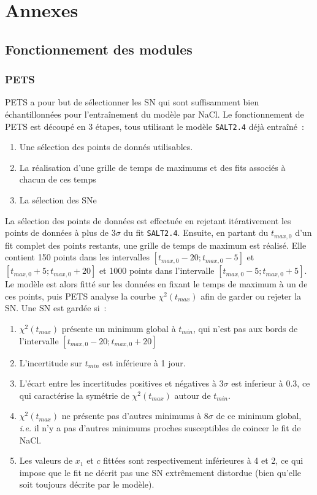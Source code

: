 \documentclass{book}
\newcommand{\todo}[1]{{\textcolor{gray}{\bf \large #1}}}
\begin{document}
\todo{}

\appendix
\chapter{Annexes}

\section{Fonctionnement des modules}

\subsection{PETS}

PETS a pour but de sélectionner les SN qui sont suffisamment bien échantillonnées pour l'entraînement du modèle par NaCl.
Le fonctionnement de PETS est découpé en 3 étapes, tous utilisant le modèle \verb|SALT2.4| déjà entraîné~:
\begin{enumerate}
\item Une sélection des points de donnés utilisables.
\item La réalisation d'une grille de temps de maximums et des fits associés à chacun de ces temps
\item La sélection des SNe
\end{enumerate}

La sélection des points de données est effectuée en rejetant itérativement les points de données à plus de 3$\sigma$ du fit \verb|SALT2.4|. Ensuite, en partant du $t_{max, 0}$ d'un fit complet des points restants, une grille de temps de maximum est réalisé. Elle contient 150 points dans les intervalles $[t_{max, 0} - 20 ; t_{max, 0} - 5]$ et $[t_{max, 0} +5; t_{max, 0} + 20]$ et 1000 points dans l'intervalle $[t_{max, 0} - 5 ; t_{max, 0} + 5]$. Le modèle est alors fitté sur les données en fixant le temps de maximum à un de ces points, puis PETS analyse la courbe $\chi^2(t_{max})$ afin de garder ou rejeter la SN. Une SN est gardée si~:
\begin{enumerate}
\item $\chi^2(t_{max})$ présente un minimum global à $t_{min}$, qui n'est pas aux bords de l'intervalle $[t_{max,0} - 20 ; t_{max, 0} + 20]$
\item L'incertitude sur $t_{min}$ est inférieure à 1 jour.
\item L'écart entre les incertitudes positives et négatives à 3$\sigma$ est inferieur à $0.3$, ce qui caractérise la symétrie de $\chi^2(t_{max})$ autour de $t_{min}$.
\item $\chi^2(t_{max})$ ne présente pas d'autres minimums à 8$\sigma$ de ce minimum global, \textit{i.e.} il n'y a pas d'autres minimums proches susceptibles de coincer le fit de NaCl.
\item Les valeurs de $x_1$ et $c$ fittées sont respectivement inférieures à 4 et 2, ce qui impose que le fit ne décrit pas une SN extrêmement distordue (bien qu'elle soit toujours décrite par le modèle).
\end{enumerate}
\end{document}
